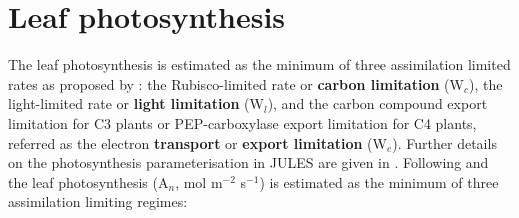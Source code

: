 \documentclass[twoside,10pt]{report}
\begin{document}
\section{Leaf photosynthesis}\label{sec:the_farquhar_model}

The leaf photosynthesis is estimated as the minimum of three assimilation limited rates as proposed by \citet{Farquhar1980}: the Rubisco-limited rate or \textbf{carbon limitation} (W$_c$), the light-limited rate or \textbf{light limitation} (W$_l$), and the carbon compound export limitation for C3 plants or PEP-carboxylase export limitation for C4 plants, referred as the electron \textbf{transport} or \textbf{export limitation} (W$_e$). Further details on the photosynthesis parameterisation in JULES are given in \citet{Clark2011}. Following \citet{Collatz1991,Collatz1992} and \citet{Oleson2010} the leaf photosynthesis (A$_n$, mol m$^{-2}$ s$^{-1}$) is estimated as the minimum of three assimilation limiting regimes:
\end{document}
